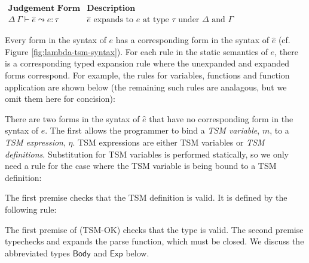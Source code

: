 $\begin{array}{ll}
\textbf{Judgement Form} & \textbf{Description}\\
\Delta~\Gamma \vdash \hat{e} \leadsto e : \tau & \text{$\hat{e}$ expands to $e$ at type $\tau$ under $\Delta$ and $\Gamma$}
\end{array}$

Every form in the syntax of $e$ has a corresponding form in the syntax of $\hat{e}$ (cf. Figure \ref{fig:lambda-tsm-syntax}). For each rule in the static semantics of $e$, there is a corresponding typed expansion rule where the unexpanded and expanded forms correspond. For example, the rules for variables, functions and function application are shown below (the remaining such rules are analagous, but we omit them here for concision):
\begin{mathpar}


\end{mathpar}
There are two forms in the syntax of $\hat{e}$ that have no corresponding form in the syntax of $e$. The first allows the programmer to bind a \emph{TSM variable}, $m$, to a \emph{TSM expression}, $\eta$. TSM expressions are either TSM variables or \emph{TSM definitions}. Substitution for TSM variables is performed statically, so we only need a rule for the case where the TSM variable is being bound to a TSM definition:
\begin{mathpar}
\end{mathpar}
The first premise checks that the TSM definition is valid. It is defined by the following rule:
\begin{mathpar}
\end{mathpar}
The first premise of (TSM-OK) checks that the type is valid. The second premise typechecks and expands the parse function, which must be closed. We discuss the abbreviated types $\mathsf{Body}$ and $\mathsf{Exp}$ below.


